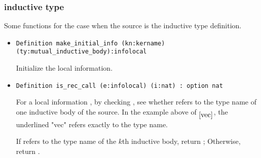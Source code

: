 \documentclass[a4paper,UKenglish,cleveref, autoref, thm-restate]{lipics-v2021}
\begin{document}
\subsubsection{inductive type}
Some functions for the case when the source is the inductive type definition.
\begin{itemize}

\item 
\begin{lstlisting}[language = {Coq}, basicstyle = \small]
Definition make_initial_info (kn:kername) (ty:mutual_inductive_body):infolocal
\end{lstlisting}

Initialize the local information.


\item
\begin{lstlisting}[language = {Coq}, basicstyle = \small]
Definition is_rec_call (e:infolocal) (i:nat) : option nat
\end{lstlisting}
For a local information , by checking , see whether  refers to the type name of one inductive body of the source. In the example above of $_{\ref{vec}}$, the underlined "vec" refers exactly to the type name.


If  refers to the type name of the $k$th inductive body, return ; Otherwise, return .


\end{itemize}
\end{document}
